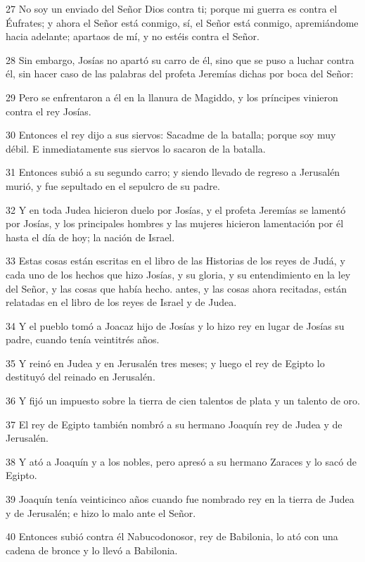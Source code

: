 \par 27 No soy un enviado del Señor Dios contra ti; porque mi guerra es contra el Éufrates; y ahora el Señor está conmigo, sí, el Señor está conmigo, apremiándome hacia adelante; apartaos de mí, y no estéis contra el Señor.
\par 28 Sin embargo, Josías no apartó su carro de él, sino que se puso a luchar contra él, sin hacer caso de las palabras del profeta Jeremías dichas por boca del Señor:
\par 29 Pero se enfrentaron a él en la llanura de Magiddo, y los príncipes vinieron contra el rey Josías.
\par 30 Entonces el rey dijo a sus siervos: Sacadme de la batalla; porque soy muy débil. E inmediatamente sus siervos lo sacaron de la batalla.
\par 31 Entonces subió a su segundo carro; y siendo llevado de regreso a Jerusalén murió, y fue sepultado en el sepulcro de su padre.
\par 32 Y en toda Judea hicieron duelo por Josías, y el profeta Jeremías se lamentó por Josías, y los principales hombres y las mujeres hicieron lamentación por él hasta el día de hoy; la nación de Israel.
\par 33 Estas cosas están escritas en el libro de las Historias de los reyes de Judá, y cada uno de los hechos que hizo Josías, y su gloria, y su entendimiento en la ley del Señor, y las cosas que había hecho. antes, y las cosas ahora recitadas, están relatadas en el libro de los reyes de Israel y de Judea.
\par 34 Y el pueblo tomó a Joacaz hijo de Josías y lo hizo rey en lugar de Josías su padre, cuando tenía veintitrés años.
\par 35 Y reinó en Judea y en Jerusalén tres meses; y luego el rey de Egipto lo destituyó del reinado en Jerusalén.
\par 36 Y fijó un impuesto sobre la tierra de cien talentos de plata y un talento de oro.
\par 37 El rey de Egipto también nombró a su hermano Joaquín rey de Judea y de Jerusalén.
\par 38 Y ató a Joaquín y a los nobles, pero apresó a su hermano Zaraces y lo sacó de Egipto.
\par 39 Joaquín tenía veinticinco años cuando fue nombrado rey en la tierra de Judea y de Jerusalén; e hizo lo malo ante el Señor.
\par 40 Entonces subió contra él Nabucodonosor, rey de Babilonia, lo ató con una cadena de bronce y lo llevó a Babilonia.
